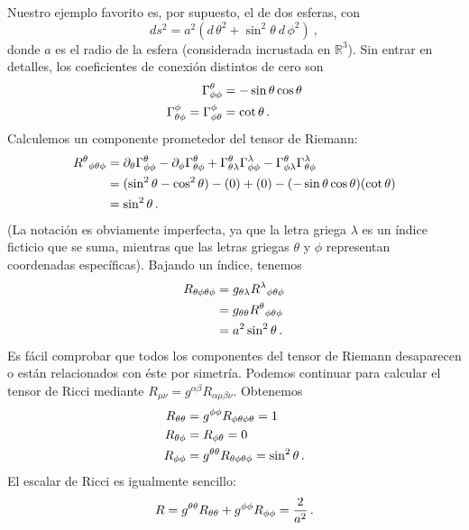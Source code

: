 \documentclass[11pt,b5paper,openany,twoside]{book}
\newcommand{\mn}{{\mu\nu}}
\newcommand{\p}[1]{{\partial_{#1}}}
\newcommand{\R}{\mathbb{R}}
\begin{document}
Nuestro ejemplo favorito es, por supuesto, el de dos esferas, con
\begin{equation}
ds^2 = a^2( d\,\theta^2 + \sin^2\theta ~  d\,\phi^2)\ ,\label{3.100}
\end{equation}
donde $a$ es el radio de la esfera (considerada incrustada en $\R^3$).
Sin entrar en detalles, los coeficientes de conexión distintos de cero son
\begin{align}
\Gamma^\theta_{\phi\phi} &=  -\sin\theta \cos\theta \notag \\
\Gamma^\phi_{\theta\phi} = \Gamma^\phi_{\phi\theta} &=
\cot\theta\,. \label{3.101}
\end{align}
Calculemos un componente prometedor del tensor de Riemann:
\begin{align}
R^\theta{}_{\phi\theta\phi} &=  \p\theta
\Gamma^\theta_{\phi\phi} - \p\phi \Gamma^\theta_{\theta\phi}
+\Gamma^\theta_{\theta\lambda}\Gamma^\lambda_{\phi\phi}
-\Gamma^\theta_{\phi\lambda}\Gamma^\lambda_{\theta\phi} \notag \\
&=  (\sin^2\theta - \cos^2\theta) -(0) + (0) - (-\sin\theta
\cos\theta)(\cot\theta) \notag \\
&=  \sin^2\theta\,. \label{3.102}
\end{align}
(La notación es obviamente imperfecta, ya que la letra griega $\lambda$ es un índice ficticio que se suma, mientras que las letras griegas $\theta$ y $\phi$ representan coordenadas específicas).
Bajando un índice, tenemos
\begin{align}
R_{\theta\phi\theta\phi} &=  g_{\theta\lambda}
R^\lambda{}_{\phi\theta\phi} \notag \\
&= g_{\theta\theta}R^\theta{}_{\phi\theta\phi} \notag \\
&=  a^2\sin^2\theta\,. \label{3.103}
\end{align}
Es fácil comprobar que todos los componentes del tensor de Riemann desaparecen o están relacionados con éste por simetría.
Podemos continuar para calcular el tensor de Ricci mediante $R_{\mn}=g^{\alpha\beta}R_{\alpha\mu \beta\nu}$.
Obtenemos
\begin{align}
R_{\theta\theta} &=  g^{\phi\phi}R_{\phi\theta\phi\theta}
= 1 \notag \\
R_{\theta\phi} &=  R_{\phi\theta} = 0 \notag \\
R_{\phi\phi} &=  g^{\theta\theta}R_{\theta\phi\theta\phi}
= \sin^2\theta\,. \label{3.104}
\end{align}
El escalar de Ricci es igualmente sencillo:
\begin{equation}
R = g^{\theta\theta}R_{\theta\theta}+ g^{\phi\phi}R_{\phi\phi}
= {2\over{a^2}}\,.\label{3.105}
\end{equation}
\end{document}
